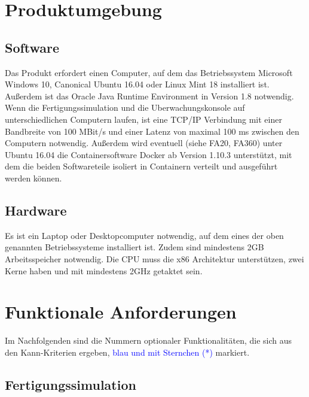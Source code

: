 \documentclass[parskip=full]{scrartcl}
\begin{document}
\pagebreak
\section{Produktumgebung}
\subsection{Software}
Das Produkt erfordert einen Computer, auf dem das Betriebssystem Microsoft Windows 10, Canonical Ubuntu 16.04 oder Linux Mint 18 installiert ist.
Außerdem ist das Oracle Java Runtime Environment in Version 1.8
notwendig. Wenn die \gls{Fertigungssimulation} und die \gls{Uberwachungskonsole} auf unterschiedlichen Computern laufen,
ist eine \gls{TCP/IP} Verbindung mit einer Bandbreite von 100 MBit/s und einer Latenz von maximal 100 ms zwischen den Computern notwendig.
Außerdem wird eventuell (siehe FA20, FA360) unter Ubuntu 16.04 die Containersoftware Docker
ab Version 1.10.3 unterstützt, mit dem die beiden Softwareteile isoliert in Containern verteilt und ausgeführt werden können.

\subsection{Hardware}
\label{Hardware}
Es ist ein Laptop oder Desktopcomputer notwendig, auf dem eines der oben genannten Betriebssysteme installiert ist.
Zudem sind mindestens 2GB Arbeitsspeicher notwendig. Die CPU muss die x86 Architektur unterstützen, zwei Kerne haben und mit
mindestens 2GHz getaktet sein.

\pagebreak
\section{Funktionale Anforderungen}
Im Nachfolgenden sind die Nummern optionaler Funktionalitäten, die sich aus den Kann-Kriterien ergeben, \textcolor{blue}{blau und mit Sternchen (*)} markiert.

\subsection{Fertigungssimulation}
\end{document}
